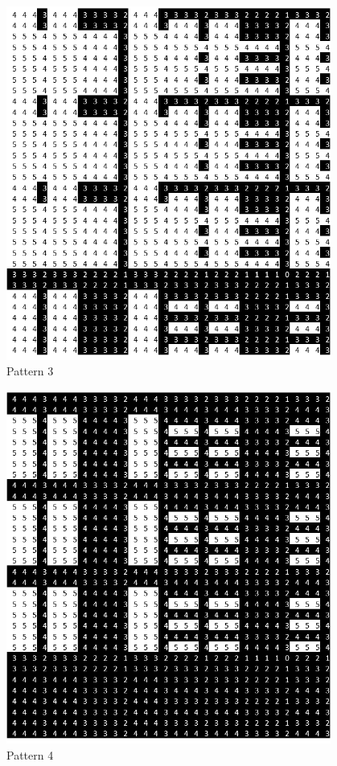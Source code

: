\documentclass[oneside,12pt]{DISCSthesis}
\begin{document}
{\begin{figure}[h]
			\begin{minipage}{.135\textwidth}\centering\includegraphics[width=0.95\textwidth]{img/3}\\ Pattern 3 \end{minipage}
			\begin{minipage}{.135\textwidth}\centering\includegraphics[width=0.95\textwidth]{img/4}\\ Pattern 4 \end{minipage}

\end{figure}}
\end{document}
